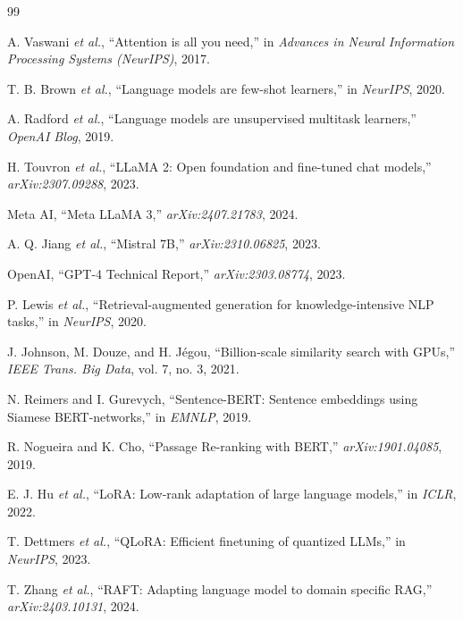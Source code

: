 \documentclass[10pt,journal,compsoc]{IEEEtran}
\begin{document}
\begin{thebibliography}{99}

A. Vaswani \textit{et al.},
``Attention is all you need,''
in \textit{Advances in Neural Information Processing Systems (NeurIPS)},
2017.

T. B. Brown \textit{et al.},
``Language models are few-shot learners,''
in \textit{NeurIPS}, 2020.

A. Radford \textit{et al.},
``Language models are unsupervised multitask learners,''
\textit{OpenAI Blog}, 2019.

H. Touvron \textit{et al.},
``LLaMA 2: Open foundation and fine-tuned chat models,''
\textit{arXiv:2307.09288}, 2023.

Meta AI,
``Meta LLaMA 3,''
\textit{arXiv:2407.21783}, 2024.

A. Q. Jiang \textit{et al.},
``Mistral 7B,''
\textit{arXiv:2310.06825}, 2023.

OpenAI,
``GPT-4 Technical Report,''
\textit{arXiv:2303.08774}, 2023.

P. Lewis \textit{et al.},
``Retrieval-augmented generation for knowledge-intensive NLP tasks,''
in \textit{NeurIPS}, 2020.

J. Johnson, M. Douze, and H. Jégou,
``Billion-scale similarity search with GPUs,''
\textit{IEEE Trans. Big Data}, vol. 7, no. 3, 2021.

N. Reimers and I. Gurevych,
``Sentence-BERT: Sentence embeddings using Siamese BERT-networks,''
in \textit{EMNLP}, 2019.

R. Nogueira and K. Cho,
``Passage Re-ranking with BERT,''
\textit{arXiv:1901.04085}, 2019.

E. J. Hu \textit{et al.},
``LoRA: Low-rank adaptation of large language models,''
in \textit{ICLR}, 2022.

T. Dettmers \textit{et al.},
``QLoRA: Efficient finetuning of quantized LLMs,''
in \textit{NeurIPS}, 2023.

T. Zhang \textit{et al.},
``RAFT: Adapting language model to domain specific RAG,''
\textit{arXiv:2403.10131}, 2024.


\end{thebibliography}
\end{document}
